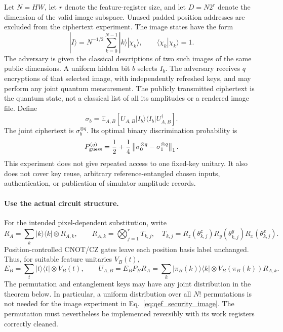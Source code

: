 {Let $N=HW$, let $r$ denote the feature-register size, and let
$D=N2^r$ denote the dimension of the valid image subspace. Unused padded
position addresses are excluded from the ciphertext experiment. The image
states have the form
\begin{equation}
\label{eq:qef_security_image}
 |I\rangle=N^{-1/2}\sum_{k=0}^{N-1}|k\rangle|\chi_k\rangle,
 \qquad \langle\chi_k|\chi_k\rangle=1.
\end{equation}
The adversary is given the classical descriptions of two such images of
the same public dimensions. A uniform hidden bit $b$ selects $I_b$.
The adversary receives $q$ encryptions of that selected image, with
independently refreshed keys, and may perform any joint quantum
measurement. The publicly transmitted ciphertext is the quantum state,
not a classical list of all its amplitudes or a rendered image file.
Define
\begin{equation}
\label{eq:qef_averaged_cipher}
 \sigma_b=\mathbb E_{A,B}
   [U_{A,B}|I_b\rangle\langle I_b|U_{A,B}^{\dagger}].
\end{equation}
The joint ciphertext is $\sigma_b^{\otimes q}$. Its optimal binary
discrimination probability is \cite{Watrous2018QEF}
\begin{equation}
\label{eq:qef_operational_guess}
 P_{\rm guess}^{(q)}
 =\frac12+\frac14\left\|
       \sigma_0^{\otimes q}-\sigma_1^{\otimes q}\right\|_1.
\end{equation}
This experiment does not give repeated access to one fixed-key unitary.
It also does not cover key reuse, arbitrary reference-entangled chosen
inputs, authentication, or publication of simulator amplitude records.

\paragraph{Use the actual circuit structure.}
For the intended pixel-dependent substitution, write
\begin{equation}
 R_A=\sum_k |k\rangle\langle k|\otimes R_{A,k},\qquad
 R_{A,k}=\bigotimes_{j=1}^r T_{k,j},\quad
 T_{k,j}=R_z(\theta_{k,j}^z)R_y(\theta_{k,j}^y)R_x(\theta_{k,j}^x).
\end{equation}
Position-controlled CNOT/CZ gates leave each position basis label
unchanged. Thus, for suitable feature unitaries $V_B(t)$,
\begin{equation}
 E_B=\sum_t |t\rangle\langle t|\otimes V_B(t),\qquad
 U_{A,B}=E_BP_BR_A
 =\sum_k |\pi_B(k)\rangle\langle k|
       \otimes V_B(\pi_B(k))R_{A,k}.
\end{equation}
The permutation and entanglement keys may have any joint distribution
in the theorem below. In particular, a uniform distribution over all
$N!$ permutations is not needed for the image experiment in
Eq.~\eqref{eq:qef_security_image}. The permutation must nevertheless be
implemented reversibly with its work registers correctly cleaned.

}

